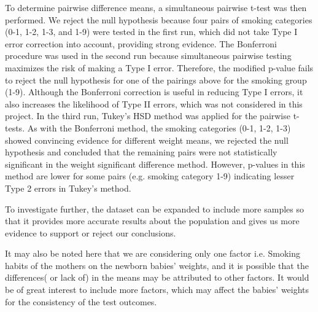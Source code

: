 \documentclass[fontsize=12 pt]{scrartcl}
\begin{document}
To determine pairwise difference means, a simultaneous pairwise t-test was then performed. We reject the null hypothesis because four pairs of smoking categories (0-1, 1-2, 1-3, and 1-9) were tested in the first run, which did not take Type I error correction into account, providing strong evidence. The Bonferroni procedure was used in the second run because simultaneous pairwise testing maximizes the risk of making a Type I error. Therefore, the modified p-value fails to reject the null hypothesis for one of the pairings above for the smoking group (1-9). Although the Bonferroni correction is useful in reducing Type I errors, it also increases the likelihood of Type II errors, which was not considered in this project. In the third run, Tukey's HSD method was applied for the pairwise t-tests. As with the Bonferroni method, the smoking categories (0-1, 1-2, 1-3) showed convincing evidence for different weight means, we rejected the null hypothesis and concluded that the remaining pairs were not statistically significant in the weight significant difference method. However, p-values in this method are lower for some pairs (e.g. smoking category 1-9) indicating lesser Type 2 errors in Tukey's method.

To investigate further, the dataset can be expanded to include more samples so that it provides more accurate results about the population and gives us more evidence to support or reject our conclusions. 

It may also be noted here that we are considering only one factor i.e. Smoking habits of the mothers on the newborn babies' weights, and it is possible that the differences( or lack of) in the means may be attributed to other factors. It would be of great interest to include more factors, which may affect the babies' weights for the consistency of the test outcomes.

\newpage
{}
\renewcommand\refname{Bibliography} 


\end{document}
